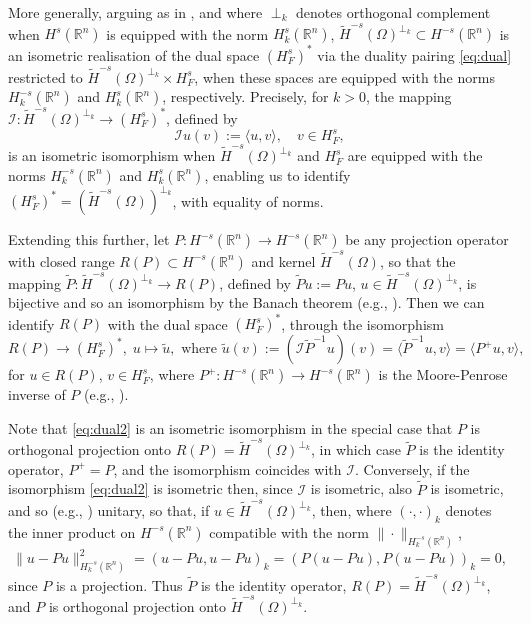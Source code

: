 \documentclass{birkjour}
\theoremstyle{definition}
\theoremstyle{remark}
\numberwithin{equation}{section}
\newcommand{\R}{\mathbb{R}}
\begin{document}
More generally, arguing as in  \cite[Thm.~3.15]{ChHeMo:17}, and where $\perp_k$ denotes orthogonal complement when $H^s(\R^n)$ is equipped with the norm $H^s_k(\R^n)$, $\widetilde H^{-s}(\Omega)^{\perp_k} \subset H^{-s}(\R^n)$ is an isometric realisation of the dual space $(H^s_F)^*$ via the duality pairing \eqref{eq:dual} restricted to $\widetilde H^{-s}(\Omega)^{\perp_k} \times H^s_F$, when these spaces are equipped with the norms $H^{-s}_k(\R^n)$ and $H^s_k(\R^n)$, respectively. Precisely, for $k>0$, the mapping $\mathcal{I}:\widetilde H^{-s}(\Omega)^{\perp_k} \to (H^s_F)^*$, defined by
$$
\mathcal{I}u(v) := \langle u,v\rangle, \quad v\in H^s_F,
$$
is an isometric isomorphism when $\widetilde H^{-s}(\Omega)^{\perp_k}$ and  $H^s_F$ are equipped with the norms $H^{-s}_k(\R^n)$ and $H^s_k(\R^n)$, enabling us to identify $(H^s_F)^*=(\widetilde H^{-s}(\Omega))^{\perp_k}$, with equality of norms.  

Extending this further, %
let $P:H^{-s}(\R^n)\to H^{-s}(\R^n)$ be any projection operator with closed range $R(P)\subset H^{-s}(\R^n)$ and kernel $\widetilde H^{-s}(\Omega)$, so that the mapping $\widetilde P:\widetilde H^{-s}(\Omega)^{\perp_k}\to R(P)$, defined by $\widetilde Pu :=Pu$, $u\in  \widetilde H^{-s}(\Omega)^{\perp_k}$, is bijective and so an isomorphism by the Banach theorem (e.g., \cite[Corollaries 2.12]{RudinFA}). Then we can identify $R(P)$ with the dual space $(H_F^s)^*$, through the isomorphism
\begin{equation} \label{eq:dual2}
R(P)\to (H_F^s)^*, \; u\mapsto \tilde u, \mbox{ where } \tilde u(v) := (\mathcal{I}\widetilde P^{-1}u)(v)=\langle \widetilde P^{-1}u,v\rangle = \langle P^+u,v\rangle,
\end{equation}
for $u\in R(P)$, $v\in H_F^s$, where $P^+:H^{-s}(\R^n)\to H^{-s}(\R^n)$ is the Moore-Penrose inverse of $P$ (e.g., \cite[\S2.1.2]{Hagen}).

Note that \eqref{eq:dual2}  is an isometric isomorphism in the special case that %
$P$ is orthogonal projection onto $R(P) =  \widetilde H^{-s}(\Omega)^{\perp_k}$, in which case $\widetilde P$ is the identity operator, $P^+=P$, and the isomorphism coincides with $\mathcal{I}$. Conversely, if the isomorphism \eqref{eq:dual2}  is isometric then, since $\mathcal{I}$ is isometric, also $\widetilde P$ is isometric, and so (e.g., \cite[Theorem 12.13]{RudinFA}) unitary, so that, if $u\in \widetilde H^{-s}(\Omega)^{\perp_k}$, then, where $(\cdot,\cdot)_{k}$ denotes the inner product on $H^{-s}(\R^n)$ compatible with the norm $\|\cdot\|_{H_k^{-s}(\R^n)}$, 
$$
\|u-Pu\|^2_{H_k^{-s}(\R^n)} =(u-Pu,u-Pu)_{k}=(P(u-Pu),P(u-Pu))_{k}=0,
$$
since $P$ is a projection. Thus $\widetilde P$ is the identity operator, $R(P)=\widetilde H^{-s}(\Omega)^{\perp_k}$, and $P$ is orthogonal projection onto $\widetilde H^{-s}(\Omega)^{\perp_k}$.
\end{document}
